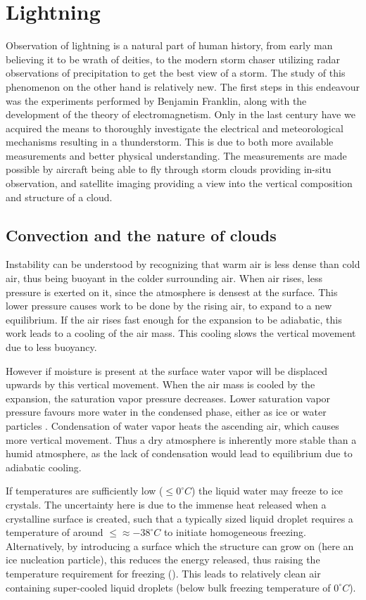 \setcounter{chapter}{1} 

\chapter{Lightning}
Observation of lightning is a  natural part of human history, from early man believing it to be wrath of deities, to the modern storm chaser utilizing radar observations of precipitation to get the best view of a storm. The study of this phenomenon on the other hand is relatively new. The first steps in this endeavour was the experiments performed by Benjamin Franklin, along with the development of the theory of electromagnetism. Only in the last century have we acquired the means to thoroughly investigate the electrical and meteorological mechanisms resulting in a thunderstorm. This is due to both more available measurements and better physical understanding. The measurements are made possible by aircraft being able to fly through storm clouds providing in-situ observation, and satellite imaging providing a view into the vertical composition and structure of a cloud.

\section{Convection and the nature of clouds}

Instability can be understood by recognizing that warm air is less dense than cold air, thus being buoyant in the colder surrounding air. When air rises, less pressure is exerted on it, since the atmosphere is densest at the surface. This lower pressure causes work to be done by the rising air, to expand to a new equilibrium. If the air rises fast enough for the expansion to be adiabatic, this work leads to a cooling of the air mass. This cooling slows the vertical movement due to less buoyancy.

However if moisture is present at the surface water vapor will be displaced upwards by this vertical movement. When the air mass is cooled by the expansion, the saturation vapor pressure decreases. Lower saturation vapor pressure favours more water in the condensed phase, either as ice or water particles . Condensation of water vapor heats the ascending air, which causes more vertical movement. Thus a dry atmosphere is inherently more stable than a humid atmosphere, as the lack of condensation would lead to equilibrium due to adiabatic cooling.

If temperatures are sufficiently low ($\leq 0 ^{\circ} C$) the liquid water may freeze to ice crystals. The uncertainty here is due to the immense heat released when a crystalline surface is created, such that a typically sized liquid droplet requires a temperature of around $\leq \approx-38 ^{\circ} C$ to initiate homogeneous freezing. Alternatively, by introducing a surface which the structure can grow on (here an ice nucleation particle), this reduces the energy released, thus raising the temperature requirement for freezing (\cite{jeffery1997}). This leads to relatively clean air containing super-cooled liquid droplets (below bulk freezing temperature of $0 ^{\circ} C$).

